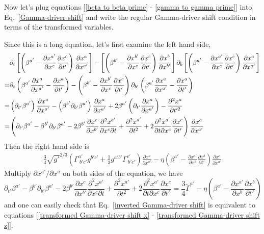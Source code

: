 \documentclass[letterpaper,nofootinbib,prd,amsmath,onecolumn]{revtex4-1}
\begin{document}
Now let's plug equations [\ref{beta to beta prime} - \ref{gamma to gamma prime}] into Eq.~\ref{Gamma-driver shift} and write the regular Gamma-driver shift condition in terms of the transformed variables. 

Since this is a long equation, let's first examine the left hand side, 
\begin{align}
& \partial_{t}\left[\left(\beta^{a'} - \frac{\partial x^{a'}}{\partial x^{c}}\frac{\partial x^{c}}{\partial t'}\right)\frac{\partial x^{a}}{\partial x^{a'}}\right] - \left[\left(\beta^{b'} - \frac{\partial x^{b'}}{\partial x^{c}}\frac{\partial x^{c}}{\partial t'}\right)\frac{\partial x^{b}}{\partial x^{b'}}\right]\partial_{b}\left[\left(\beta^{a'} - \frac{\partial x^{a'}}{\partial x^{c}}\frac{\partial x^{c}}{\partial t'}\right)\frac{\partial x^{a}}{\partial x^{a'}}\right]\notag\\
= & \partial_{t}\left(\beta^{a'}\frac{\partial x^{a}}{\partial x^{a'}} - \frac{\partial x^{a}}{\partial t'}\right) - \left(\beta^{b'} - \frac{\partial x^{b'}}{\partial x^{c}}\frac{\partial x^{c}}{\partial t'}\right)\partial_{b'}\left(\beta^{a'}\frac{\partial x^{a}}{\partial x^{a'}} - \frac{\partial x^{a}}{\partial t'}\right)\notag\\
= & \left(\partial_{t'}\beta^{a'}\right)\frac{\partial x^{a}}{\partial x^{a'}} - \left(\beta^{b'}\partial_{b'}\beta^{a'}\right)\frac{\partial x^{a}}{\partial x^{a'}} + 2\beta^{a'}\left(\partial_{t'}\frac{\partial x^{a}}{\partial x^{a'}}\right) - \frac{\partial^{2}x^{a}}{\partial t'^{2}}\notag\\
= & \left(\partial_{t'}\beta^{a'} - \beta^{b'}\partial_{b'}\beta^{a'} - 2\beta^{b'}\frac{\partial x^{c}}{\partial x^{b'}}\frac{\partial^{2}x^{a'}}{\partial x^{c}\partial t} + \frac{\partial^{2} x^{a'}}{\partial t^{2}} + 2\frac{\partial^{2} x^{a'}}{\partial t\partial x^{c}}\frac{\partial x^{c}}{\partial t'}\right)\frac{\partial x^{a}}{\partial x^{a'}}
\end{align}
Then the right hand side is
\begin{align}
\frac{3}{4}\sqrt{g'}^{2/3}\left(\Gamma^{a'}_{~b'c'}g^{b'c'} + \frac{1}{3}g^{a'b'}\Gamma^{c'}_{~b'c'}\right)\frac{\partial x^{a}}{\partial x^{a'}} - \eta\left(\beta^{a'} - \frac{\partial x^{a'}}{\partial x^{b}}\frac{\partial x^{b}}{\partial t'}\right)\frac{\partial x^{a}}{\partial x^{a'}}
\end{align}
Multiply $\partial x^{a'}/\partial x^{a}$ on both sides of the equation, we have
\begin{equation}
\partial_{t'}\beta^{a'} - \beta^{b'}\partial_{b'}\beta^{a'} - 2\beta^{b'}\frac{\partial x^{c}}{\partial x^{b'}}\frac{\partial^{2}x^{a'}}{\partial x^{c}\partial t} + \frac{\partial^{2} x^{a'}}{\partial t^{2}} +  2\frac{\partial^{2} x^{a'}}{\partial t\partial x^{c}}\frac{\partial x^{c}}{\partial t'} = \frac{3}{4}{\tilde \Gamma}^{a'} - \eta\left(\beta^{a'} - \frac{\partial x^{a'}}{\partial x^{b}}\frac{\partial x^{b}}{\partial t'}\right)\label{inverted Gamma-driver shift}
\end{equation}
and one can easily check that Eq.~\ref{inverted Gamma-driver shift} is equivalent to equations [\ref{transformed Gamma-driver shift x} - \ref{transformed Gamma-driver shift z}].
\end{document}
